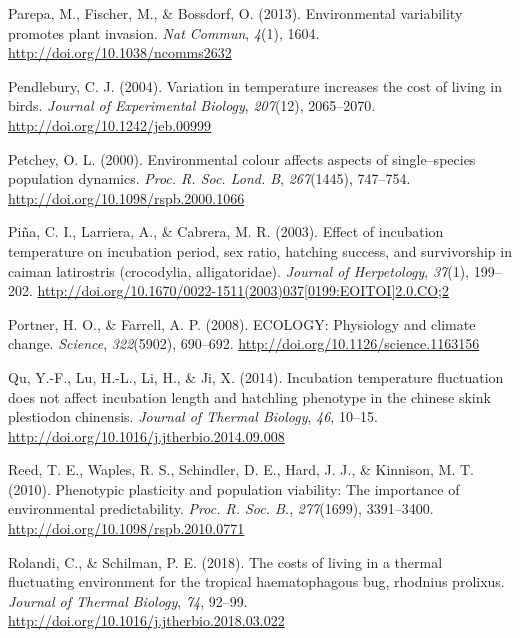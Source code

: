 \documentclass[12pt,twoside]{reedthesis}
\begin{document}
\leavevmode\hypertarget{ref-parepa_environmental_2013}{}%
Parepa, M., Fischer, M., \& Bossdorf, O. (2013). Environmental variability promotes plant invasion. \emph{Nat Commun}, \emph{4}(1), 1604. \url{http://doi.org/10.1038/ncomms2632}

\leavevmode\hypertarget{ref-pendlebury_variation_2004-1}{}%
Pendlebury, C. J. (2004). Variation in temperature increases the cost of living in birds. \emph{Journal of Experimental Biology}, \emph{207}(12), 2065--2070. \url{http://doi.org/10.1242/jeb.00999}

\leavevmode\hypertarget{ref-petchey_environmental_2000}{}%
Petchey, O. L. (2000). Environmental colour affects aspects of single--species population dynamics. \emph{Proc. R. Soc. Lond. B}, \emph{267}(1445), 747--754. \url{http://doi.org/10.1098/rspb.2000.1066}

\leavevmode\hypertarget{ref-pina_effect_2003}{}%
Piña, C. I., Larriera, A., \& Cabrera, M. R. (2003). Effect of incubation temperature on incubation period, sex ratio, hatching success, and survivorship in caiman latirostris (crocodylia, alligatoridae). \emph{Journal of Herpetology}, \emph{37}(1), 199--202. \href{http://doi.org/10.1670/0022-1511(2003)037\%5B0199:EOITOI\%5D2.0.CO;2}{http://doi.org/10.1670/0022-1511(2003)037{[}0199:EOITOI{]}2.0.CO;2}

\leavevmode\hypertarget{ref-portner_ecology_2008}{}%
Portner, H. O., \& Farrell, A. P. (2008). ECOLOGY: Physiology and climate change. \emph{Science}, \emph{322}(5902), 690--692. \url{http://doi.org/10.1126/science.1163156}

\leavevmode\hypertarget{ref-qu_incubation_2014}{}%
Qu, Y.-F., Lu, H.-L., Li, H., \& Ji, X. (2014). Incubation temperature fluctuation does not affect incubation length and hatchling phenotype in the chinese skink plestiodon chinensis. \emph{Journal of Thermal Biology}, \emph{46}, 10--15. \url{http://doi.org/10.1016/j.jtherbio.2014.09.008}

\leavevmode\hypertarget{ref-reed_phenotypic_2010}{}%
Reed, T. E., Waples, R. S., Schindler, D. E., Hard, J. J., \& Kinnison, M. T. (2010). Phenotypic plasticity and population viability: The importance of environmental predictability. \emph{Proc. R. Soc. B.}, \emph{277}(1699), 3391--3400. \url{http://doi.org/10.1098/rspb.2010.0771}

\leavevmode\hypertarget{ref-rolandi_costs_2018}{}%
Rolandi, C., \& Schilman, P. E. (2018). The costs of living in a thermal fluctuating environment for the tropical haematophagous bug, rhodnius prolixus. \emph{Journal of Thermal Biology}, \emph{74}, 92--99. \url{http://doi.org/10.1016/j.jtherbio.2018.03.022}
\end{document}
